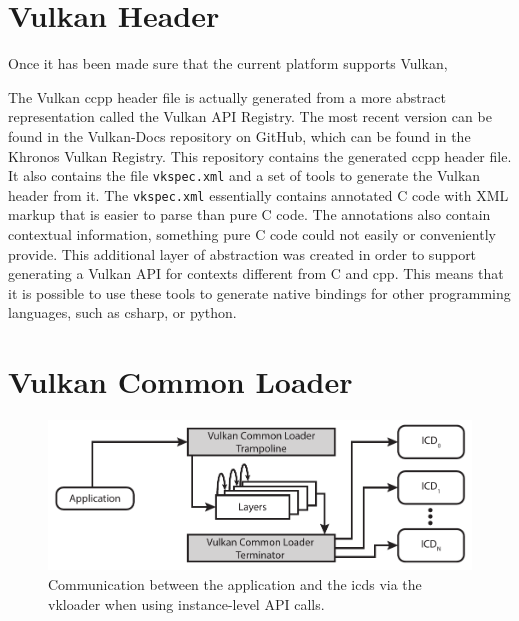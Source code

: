 


  \section{Vulkan Header}
  \label{sec:VulkanHeader}
    Once it has been made sure that the current platform supports Vulkan, 

    The Vulkan \gls{ccpp} header file is actually generated from a more abstract representation called the Vulkan API Registry. The most recent version can be found in the Vulkan-Docs repository on GitHub, which can be found in the Khronos Vulkan Registry\cite{vulkanregistry}. This repository contains the generated \gls{ccpp} header file. It also contains the file \lstinline{vkspec.xml} and a set of tools to generate the Vulkan header from it. The \lstinline{vkspec.xml} essentially contains annotated C code with XML markup that is easier to parse than pure C code. The annotations also contain contextual information, something pure C code could not easily or conveniently provide. This additional layer of abstraction was created in order to support generating a Vulkan API for contexts different from C and \gls{cpp}. This means that it is possible to use these tools to generate native bindings for other programming languages, such as \gls{csharp}, or \gls{python}.


  \section{Vulkan Common Loader}
  \label{sec:VulkanLoader}

    \begin{figure}
      \includegraphics{Main/Images/VulkanLoaderInstanceLayers}
      \centering
      \caption{Communication between the application and the \glspl{icd} via the \gls{vkloader} when using instance-level API calls.}
      \label{fig:VulkanLoaderWithInstanceLayers}
    \end{figure}

